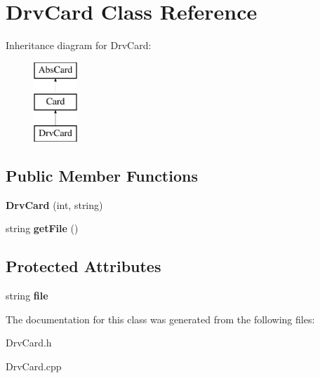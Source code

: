 \hypertarget{class_drv_card}{}\section{Drv\+Card Class Reference}
\label{class_drv_card}
Inheritance diagram for Drv\+Card\+:\begin{figure}[H]
\begin{center}
\leavevmode
\includegraphics[height=3.000000cm]{class_drv_card}
\end{center}
\end{figure}
\subsection*{Public Member Functions}
\begin{DoxyCompactItemize}
\item 
\mbox{\label{class_drv_card_a90bd82ad7d3c2455152d26ac5ec347f8}} 
{\bfseries Drv\+Card} (int, string)
\item 
\mbox{\label{class_drv_card_aa34b431760753c3d1f5dd56451a76db5}} 
string {\bfseries get\+File} ()
\end{DoxyCompactItemize}
\subsection*{Protected Attributes}
\begin{DoxyCompactItemize}
\item 
\mbox{\label{class_drv_card_ac509aaf1e1795723c809d2519b90a3b9}} 
string {\bfseries file}
\end{DoxyCompactItemize}


The documentation for this class was generated from the following files\+:\begin{DoxyCompactItemize}
\item 
Drv\+Card.\+h\item 
Drv\+Card.\+cpp\end{DoxyCompactItemize}
